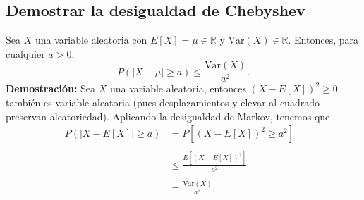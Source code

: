 \documentclass{article}
\begin{document}
\subsection{Demostrar la desigualdad de Chebyshev}
\noindent Sea $X$ una variable aleatoria con $E[X] = \mu \in \mathbb{R}$ y $\mathrm{Var}(X) \in \mathbb{R}$. Entonces, para cualquier $a>0$, \[P(|X - \mu | \geq a) \leq \frac{\mathrm{Var}(X)}{a^2}.\]
\textbf{Demostración:} Sea $X$ una variable aleatoria, entonces $(X - E[X])^2 \geq 0$ también es variable aleatoria (pues desplazamientos y elevar al cuadrado preservan aleatoriedad). Aplicando la desigualdad de Markov, tenemos que
\begin{align*}
    P(|X - E[X]| \geq a)
    &= P\left[(X-E[X])^2 \geq a^2\right] &\\ \\
    & \leq \frac{E\left[(X-E[X])^2\right]}{a^2} &\\ \\
    & = \frac{\mathrm{Var}(X)}{a^2}.
\end{align*}
\end{document}
